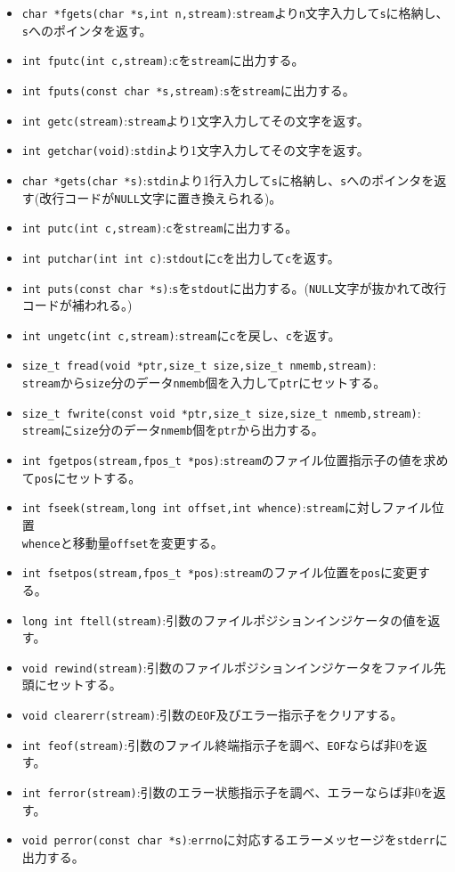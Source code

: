 \begin{itemize}
\item \verb|char *fgets(char *s,int n,stream)|:\verb|stream|より\verb|n|文字入力して\verb|s|に格納し、\verb|s|へのポインタを返す。
\item \verb|int fputc(int c,stream)|:\verb|c|を\verb|stream|に出力する。
\item \verb|int fputs(const char *s,stream)|:\verb|s|を\verb|stream|に出力する。
\item \verb|int getc(stream)|:\verb|stream|より1文字入力してその文字を返す。
\item \verb|int getchar(void)|:\verb|stdin|より1文字入力してその文字を返す。
\item \verb|char *gets(char *s)|:\verb|stdin|より1行入力して\verb|s|に格納し、\verb|s|へのポインタを返す(改行コードが\verb|NULL|文字に置き換えられる)。
\item \verb|int putc(int c,stream)|:\verb|c|を\verb|stream|に出力する。
\item \verb|int putchar(int int c)|:\verb|stdout|に\verb|c|を出力して\verb|c|を返す。
\item \verb|int puts(const char *s)|:\verb|s|を\verb|stdout|に出力する。(\verb|NULL|文字が抜かれて改行コードが補われる。)
\item \verb|int ungetc(int c,stream)|:\verb|stream|に\verb|c|を戻し、\verb|c|を返す。
\item \verb|size_t fread(void *ptr,size_t size,size_t nmemb,stream)|:\\ \verb|stream|から\verb|size|分のデータ\verb|nmemb|個を入力して\verb|ptr|にセットする。
\item \verb|size_t fwrite(const void *ptr,size_t size,size_t nmemb,stream)|:\\ \verb|stream|に\verb|size|分のデータ\verb|nmemb|個を\verb|ptr|から出力する。
\item \verb|int fgetpos(stream,fpos_t *pos)|:\verb|stream|のファイル位置指示子の値を求めて\verb|pos|にセットする。
\item \verb|int fseek(stream,long int offset,int whence)|:\verb|stream|に対しファイル位置\\ \verb|whence|と移動量\verb|offset|を変更する。
\item \verb|int fsetpos(stream,fpos_t *pos)|:\verb|stream|のファイル位置を\verb|pos|に変更する。
\item \verb|long int ftell(stream)|:引数のファイルポジションインジケータの値を返す。
\item \verb|void rewind(stream)|:引数のファイルポジションインジケータをファイル先頭にセットする。
\item \verb|void clearerr(stream)|:引数の\verb|EOF|及びエラー指示子をクリアする。
\item \verb|int feof(stream)|:引数のファイル終端指示子を調べ、\verb|EOF|ならば非0を返す。
\item \verb|int ferror(stream)|:引数のエラー状態指示子を調べ、エラーならば非0を返す。
\item \verb|void perror(const char *s)|:\verb|errno|に対応するエラーメッセージを\verb|stderr|に出力する。
\end{itemize}
